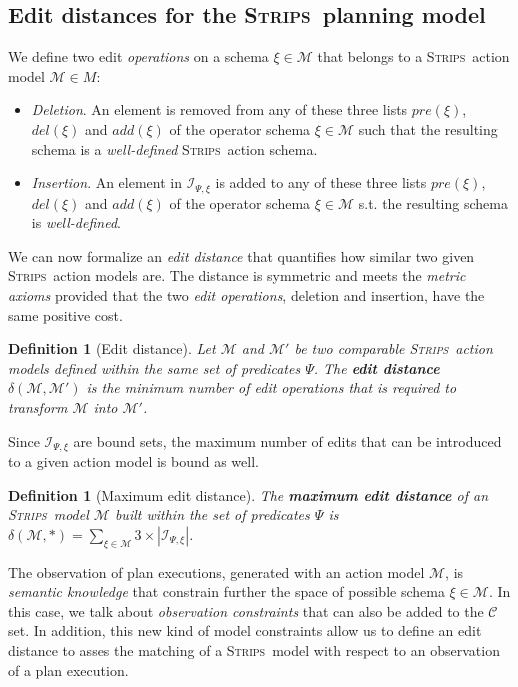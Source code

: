 \documentclass[letterpaper]{article} %
\newcommand{\strips}{\textsc{Strips}}     %
\newtheorem{definition}[theorem]{Definition}
\begin{document}
\subsection{Edit distances for the \strips\ planning model}
We define two edit \emph{operations} on a schema $\xi\in\mathcal{M}$ that belongs to a \strips\ action model $\mathcal{M}\in M$:
\begin{itemize}
\item {\em Deletion}. An element is removed from any of these three lists $pre(\xi)$, $del(\xi)$ and $add(\xi)$ of the operator schema $\xi\in\mathcal{M}$ such that the resulting schema is a {\em well-defined} \strips\ action schema.
\item {\em Insertion}. An element in ${\mathcal I}_{\Psi,\xi}$ is added to any of these three lists $pre(\xi)$, $del(\xi)$ and $add(\xi)$ of the operator schema $\xi\in\mathcal{M}$ s.t. the resulting schema is {\em well-defined}.
\end{itemize}

We can now formalize an {\em edit distance} that quantifies how similar two given \strips\ action models are. The distance is symmetric and meets the {\em metric axioms} provided that the two {\em edit operations}, deletion and insertion, have the same positive cost.

\begin{definition}[Edit distance]
  Let $\mathcal{M}$ and $\mathcal{M}'$ be two {\em comparable} \strips\ action models defined within the same set of predicates $\Psi$. The {\bf edit distance} $\delta(\mathcal{M},\mathcal{M}')$ is the minimum number of {\em edit operations} that is required to transform $\mathcal{M}$ into $\mathcal{M}'$.
\end{definition}

Since ${\mathcal I}_{\Psi,\xi}$ are bound sets, the maximum number of edits that can be introduced to a given action model is bound as well. 
\begin{definition}[Maximum edit distance]
The \textbf{maximum edit distance} of an \strips\ model $\mathcal{M}$ built within the set of predicates $\Psi$ is $\delta(\mathcal{M},*)=\sum_{\xi\in\mathcal{M}} 3\times|{\mathcal I}_{\Psi,\xi}|$.
\end{definition}

The observation of plan executions, generated with an action model $\mathcal{M}$, is {\em semantic knowledge} that constrain further the space of possible schema $\xi\in \mathcal{M}$. In this case, we talk about {\em observation constraints} that can also be added to the $\mathcal{C}$ set. In addition, this new kind of model constraints allow us to define an edit distance to asses the matching of a \strips\ model with respect to an observation of a plan execution. 
\end{document}
